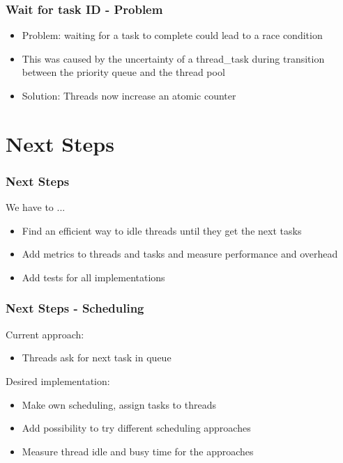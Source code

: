 \documentclass{beamer}
\begin{document}
\begin{frame}
	\frametitle{Wait for task ID - Problem}
	\begin{itemize}
		\item Problem: waiting for a task to complete could lead to a
			race condition
		\item This was caused by the uncertainty of a thread\_task
			during transition between the priority queue and the
			thread pool
		\item Solution: Threads now increase an atomic counter
	\end{itemize}
\end{frame}

\section{Next Steps}
\begin{frame}
	\frametitle{Next Steps}
	We have to ...
	\begin{itemize}
		\item Find an efficient way to idle threads until they get the next tasks
		\item Add metrics to threads and tasks and measure performance and overhead
		\item Add tests for all implementations
	\end{itemize}
\end{frame}

\begin{frame}
	\frametitle{Next Steps - Scheduling}
	Current approach:  
	\begin{itemize}
		\item Threads ask for next task in queue
	\end{itemize}
	Desired implementation: 
	\begin{itemize}
		\item Make own scheduling, assign tasks to threads
		\item Add possibility to try different scheduling approaches
		\item Measure thread idle and busy time for the approaches
	\end{itemize}
\end{frame}
\end{document}
